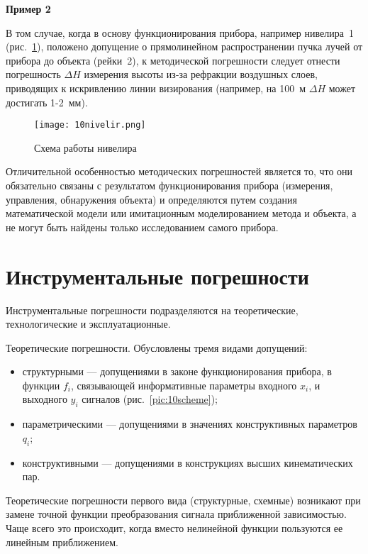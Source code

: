 \begin{flushleft}
\textbf{Пример 2}
\end{flushleft}

В том случае, когда в основу функционирования прибора, например нивелира~1 (рис.~\ref{pic:10nivelir}), положено допущение о прямолинейном распространении пучка лучей от прибора до объекта (рейки~2), к методической погрешности следует отнести погрешность $ \Delta H $ измерения высоты из-за рефракции воздушных слоев, приводящих к искривлению линии визирования (например, на 100~м $ \Delta H $ может достигать 1-2~мм).

\begin{figure}[h!]
	\caption{ Схема работы нивелира }
	\texttt{[image: 10nivelir.png]}
	\label{pic:10nivelir}
\end{figure}

Отличительной особенностью методических погрешностей является то, что они обязательно связаны с результатом функционирования прибора (измерения, управления, обнаружения объекта) и определяются путем создания математической модели или имитационным моделированием метода и объекта, а не могут быть найдены только исследованием самого прибора.

\section{Инструментальные погрешности}

Инструментальные погрешности подразделяются на теоретические, технологические и эксплуатационные.

Теоретические погрешности. Обусловлены тремя видами допущений:
\begin{itemize}
\item структурными --- допущениями в законе функционирования прибора, в функции $ f_i $, связывающей информативные параметры входного $ x_i $, и выходного $ y_i $ сигналов (рис.~\ref{pic:10scheme});
\item параметрическими --- допущениями в значениях конструктивных параметров $ q_i $;
\item конструктивными --- допущениями в конструкциях высших кинематических пар.
\end{itemize}

Теоретические погрешности первого вида (структурные, схемные) возникают при замене точной функции преобразования сигнала приближенной зависимостью. Чаще всего это происходит, когда вместо нелинейной функции пользуются ее линейным приближением.

